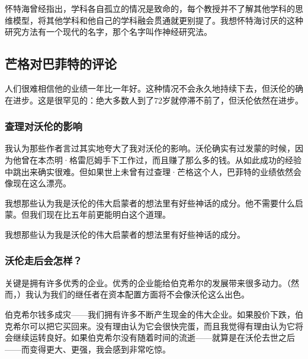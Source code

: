 怀特海曾经指出，学科各自孤立的情况是致命的，每个教授并不了解其他学科的思维模型，将其他学科和他自己的学科融会贯通就更别提了。我想怀特海讨厌的这种研究方法有一个现代的名字，那个名字叫作神经研究法。
\par

\subsection*{芒格对巴菲特的评论}

人们很难相信他的业绩一年比一年好。这种情况不会永久地持续下去，但沃伦的确在进步。这是很罕见的：绝大多数人到了72岁就停滞不前了，但沃伦依然在进步。
\par

\subsubsection*{查理对沃伦的影响}

我认为那些作者言过其实地夸大了我对沃伦的影响。沃伦确实有过发蒙的时候，因为他曾在本杰明·格雷厄姆手下工作过，而且赚了那么多的钱。从如此成功的经验中跳出来确实很难。但如果世上未曾有过查理·芒格这个人，巴菲特的业绩依然会像现在这么漂亮。
\par

我想那些认为我是沃伦的伟大启蒙者的想法里有好些神话的成分。他不需要什么启蒙。但我们现在比五年前更能明白这个道理。
\par

\begin{WisdomBox}
\par

我想那些认为我是沃伦的伟大启蒙者的想法里有好些神话的成分。
\par
\end{WisdomBox}

\subsubsection*{沃伦走后会怎样？}

关键是拥有许多优秀的企业。优秀的企业能给伯克希尔的发展带来很多动力。（然而，）我认为我们的继任者在资本配置方面将不会像沃伦这么出色。
\par

伯克希尔钱多成灾——我们拥有许多不断产生现金的伟大企业。如果股价下跌，伯克希尔可以把它买回来。没有理由认为它会很快完蛋，而且我觉得有理由认为它将会继续运转良好。如果伯克希尔没有随着时间的流逝——就算是在沃伦去世之后——而变得更大、更强，我会感到非常吃惊。
\par

